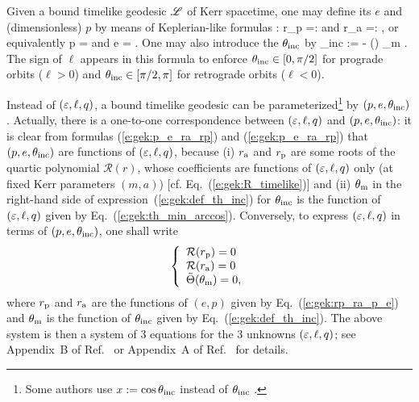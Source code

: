 Given a bound timelike geodesic $\mathscr{L}$ of Kerr spacetime, one may define
its  $e$ and (dimensionless)
 $p$ by means of Keplerian-like formulas \cite{Schmi02,DrascH06,SteinW20}:
\be \label{e:gek:rp_ra_p_e}
    r_{\rm p} =:  \qquad\mbox{and}\qquad
    r_{\rm a} =:  ,
\ee
or equivalently
\be \label{e:gek:p_e_ra_rp}
    p = 
    \qquad\mbox{and}\qquad
    e =  .
\ee
One may also introduce the  $\theta_{\rm inc}$ by
\be \label{e:gek:def_th_inc}
    \th_{\rm inc} :=  - (\ell) \th_{\rm m} .
\ee
The sign of $\ell$ appears in this formula to enforce $\theta_{\rm inc} \in [0, \pi/2]$
for prograde orbits ($\ell > 0$) and $\theta_{\rm inc} \in [\pi/2, \pi]$ for retrograde
orbits ($\ell < 0$).

Instead of $(\varepsilon,\ell,q)$, a bound timelike geodesic
can be parameterized\footnote{Some authors use $x:=\cos\theta_{\rm inc}$
instead of $\theta_{\rm inc}$ \cite{SteinW20}.}
by $(p, e, \theta_{\rm inc})$. Actually, there is a one-to-one
correspondence between $(\varepsilon,\ell,q)$ and $(p, e, \theta_{\rm inc})$:
it is clear from formulas (\ref{e:gek:p_e_ra_rp}) and (\ref{e:gek:p_e_ra_rp})
that $(p, e, \theta_{\rm inc})$ are functions of $(\varepsilon,\ell,q)$, because
(i) $r_{\rm a}$ and $r_{\rm p}$ are some roots of the quartic polynomial
$\mathcal{R}(r)$, whose coefficients are functions of $(\varepsilon,\ell,q)$ only
(at fixed Kerr parameters $(m, a)$) [cf. Eq.~(\ref{e:gek:R_timelike})] and
(ii) $\theta_{\rm m}$ in the right-hand side of expression~(\ref{e:gek:def_th_inc}) for
$\theta_{\rm inc}$ is the function of $(\varepsilon,\ell,q)$ given by Eq.~(\ref{e:gek:th_min_arccos}).
Conversely, to express $(\varepsilon,\ell,q)$ in terms of $(p, e, \theta_{\rm inc})$,
one shall write
\[
    \left\{ \begin{array}{l}
        \mathcal{R}(r_{\rm p}) = 0 \\
        \mathcal{R}(r_{\rm a}) = 0 \\
        \tilde{\Theta}(\theta_{\rm m}) = 0 ,
        \end{array} \right.
\]
where $r_{\rm p}$ and $r_{\rm a}$ are the functions of $(e,p)$ given
by Eq.~(\ref{e:gek:rp_ra_p_e}) and $\theta_{\rm m}$ is the function
of $\theta_{\rm inc}$ given by Eq.~(\ref{e:gek:def_th_inc}). The above system
is then a system of 3 equations for the 3 unknowns $(\varepsilon,\ell,q)$; see
Appendix~B of Ref.~\cite{Schmi02} or Appendix~A of Ref.~\cite{DrascH06} for details.

